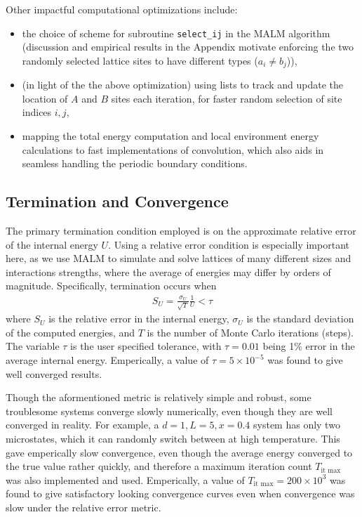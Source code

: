 \documentclass[10pt]{article}
\begin{document}
Other impactful computational optimizations include:
\begin{itemize}
\item the choice of scheme for subroutine \texttt{select\_ij} in the MALM algorithm (discussion and empirical results in the Appendix motivate enforcing the two randomly selected lattice sites to have different types ($a_i \ne b_j$)),
\item (in light of the the above optimization) using lists to track and update the location of $A$ and $B$ sites each iteration, for faster random selection of site indices $i,j$,
\item  mapping the total energy computation and local environment energy calculations to fast implementations of convolution, which also aids in seamless handling the periodic boundary conditions.
\end{itemize}

\subsection{Termination and Convergence}
The primary termination condition employed is on the approximate relative error of the internal energy $U$.
Using a relative error condition is especially important here, as we use MALM  to simulate and solve lattices of many different sizes and interactions strengths, where the average of energies may differ by orders of magnitude.
Specifically, termination occurs when
\begin{align}
    S_{U} =
    \frac{\sigma_{U}}{\sqrt{T}} \frac{1}{U}
    < \tau
\end{align}
where $S_{U}$ is the relative error in the internal energy, $\sigma_{U}$ is the standard deviation of the computed energies, and $T$ is the number of Monte Carlo iterations (steps).
The variable $\tau$ is the user specified tolerance, with $\tau = 0.01$ being 1\% error in the average internal energy.
Emperically, a value of $\tau = 5 \times 10^{-5}$ was found to give well converged results.

Though the aformentioned metric is relatively simple and robust, some troublesome systems converge slowly numerically, even though they are well converged in reality.
For example, a $d=1, L=5, x=0.4$ system has only two microstates, which it can randomly switch between at high temperature.
This gave emperically slow convergence, even though the average energy converged to the true value rather quickly, and therefore a maximum iteration count $T_{\text{it max}}$ was also implemented and used.
Emperically, a value of $T_{\text{it max}} = 200 \times 10^3$ was found to give satisfactory looking convergence curves even when convergence was slow under the relative error metric.
\end{document}
